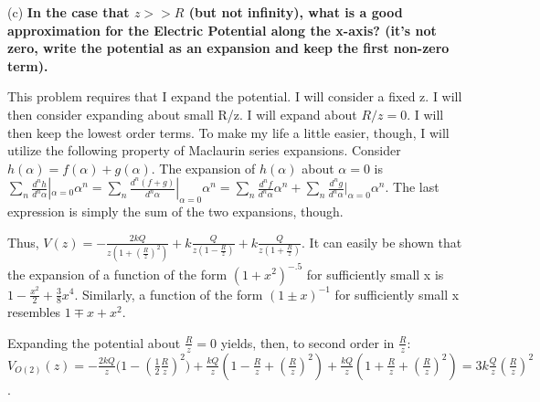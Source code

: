 \begin{homeworkProblem}
\begin{homeworkSection}{(c)}
\textbf{In the case that $z>>R$ (but not infinity), what is a good approximation for the Electric
Potential along the x-axis? (it's not zero, write the potential as an expansion and keep
the first non-zero term).}
\\ \par
This problem requires that I expand the potential. I will consider a fixed z. I will then consider expanding about small R/z. I will expand about $R/z = 0$. I will then keep the lowest order terms. To make my life a little easier, though, I will utilize the following property of Maclaurin series expansions. Consider $h(\alpha) = f(\alpha) + g(\alpha)$. The expansion of $h(\alpha)$ about $\alpha = 0$ is $\sum_n \frac{d^n h}{d^n \alpha}|_{\alpha = 0} \alpha^n = \sum_n \frac{d^n (f+g)}{d^n \alpha}|_{\alpha = 0} \alpha^n = \sum_n \frac{d^n f}{d^n \alpha} \alpha^n + \sum_n \frac{d^n g}{d^n \alpha}|_{\alpha = 0} \alpha^n$. The last expression is simply the sum of the two expansions, though.
\\ \par
Thus, $V(z) = -\frac{2kQ}{z(1+(\frac{R}{z})^2)} + k \frac{Q}{z(1-\frac{R}{z})} + k\frac{Q}{z(1+\frac{R}{z})}$. It can easily be shown that the expansion of a function of the form $(1+x^2)^{-.5}$ for sufficiently small x is $1-\frac{x^2}{2}+\frac{3}{8}x^4$. Similarly, a function of the form $(1 \pm x)^{-1}$ for sufficiently small x resembles $1 \mp x + x^2$.
\\ \par
Expanding the potential about $\frac{R}{z} = 0$ yields, then, to second order in $\frac{R}{z}$: $V_{O(2)}(z) = -\frac{2kQ}{z}\big(1-(\frac{1}{2}\frac{R}{z})^2\big)+\frac{kQ}{z}(1-\frac{R}{z}+(\frac{R}{z})^2)+\frac{kQ}{z}(1+\frac{R}{z}+(\frac{R}{z})^2)=3k\frac{Q}{z}(\frac{R}{z})^2$.

\end{homeworkSection}

\end{homeworkProblem}
